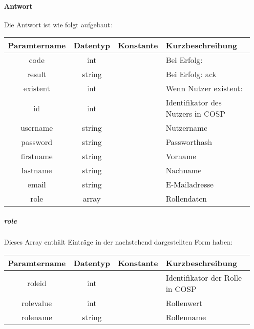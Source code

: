 \paragraph{Antwort}Die Antwort ist wie folgt aufgebaut:
\begin{table}[H]
	\begin{tabular}{|c|c|c|p{6.5cm}|}
		\hline
		\textbf{Paramtername} & \textbf{Datentyp} & \textbf{Konstante} & \textbf{Kurzbeschreibung}            \\ \hline                
		code                & int              &                 & Bei Erfolg: {\glqq 0\grqq} \\ \hline
		result              & string           &                 & Bei Erfolg: {\glqq ack\grqq} \\ \hline
		existent            & int              &                 & Wenn Nutzer existent: {\glqq 1\grqq}\\ \hline
		id                  & int              &                 & Identifikator des Nutzers in {\glqq COSP\grqq} \\ \hline
		username            & string           &                 & Nutzername \\ \hline
		password            & string           &                 & Passworthash \\ \hline
		firstname           & string           &                 & Vorname \\ \hline
		lastname            & string           &                 & Nachname \\ \hline
		email               & string           &                 & E-Mailadresse \\ \hline
		role                & array            &                 & Rollendaten \\ \hline
	\end{tabular}
\end{table}
\subparagraph{role}Dieses Array enthält Einträge in der nachstehend dargestellten Form haben:
\begin{table}[H]
	\begin{tabular}{|c|c|c|p{6.5cm}|}
		\hline
		\textbf{Paramtername} & \textbf{Datentyp} & \textbf{Konstante} & \textbf{Kurzbeschreibung}    \\ \hline
		roleid             & int               &                 & Identifikator der Rolle in {\glqq COSP\grqq} \\ \hline
		rolevalue          & int               &                 & Rollenwert \\ \hline
		rolename           & string            &                 & Rollenname \\ \hline
	\end{tabular}
\end{table}
